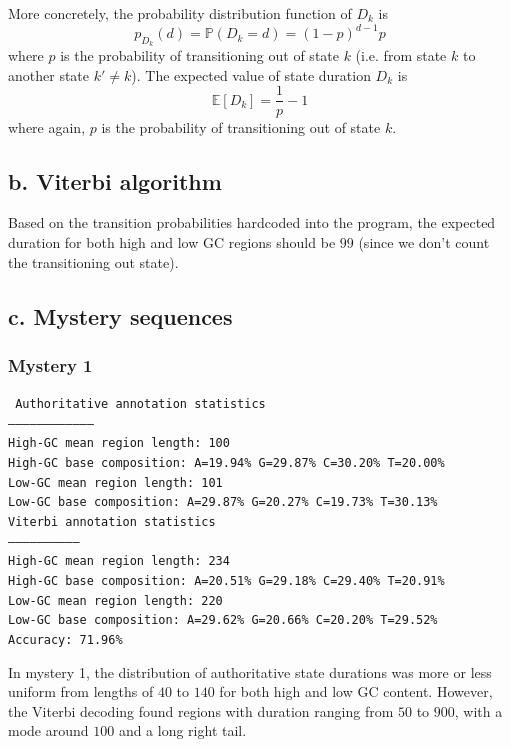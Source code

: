 \documentclass[a4paper]{article}
\begin{document}
More concretely, the probability distribution function of $D_k$ is
\[
p_{D_k}(d) = \mathbb{P}(D_k = d) = (1 - p)^{d - 1}p
\]
where $p$ is the probability of transitioning out of state $k$ (i.e. from state $k$
to another state $k' \neq k$). The expected value of state duration
$D_k$ is
\[
    \mathbb{E}[D_k] = \frac{1}{p} - 1
\]
where again, $p$ is the probability of transitioning out of state $k$.

\subsection*{b. Viterbi algorithm}
Based on the transition probabilities hardcoded into the program, 
the expected duration for both high and low GC regions 
should be $99$ (since we don't count the transitioning out state).

\subsection*{c. Mystery sequences}
\subsubsection*{Mystery 1}
{\tt
Authoritative annotation statistics\\
-----------------------------------\\
High-GC mean region length:  100\\
High-GC base composition: A=19.94\% G=29.87\% C=30.20\% T=20.00\%\\
Low-GC mean region length:  101\\
Low-GC base composition: A=29.87\% G=20.27\% C=19.73\% T=30.13\%\\

\noindent Viterbi annotation statistics\\
-----------------------------\\
High-GC mean region length:  234\\
High-GC base composition: A=20.51\% G=29.18\% C=29.40\% T=20.91\%\\
Low-GC mean region length:  220\\
Low-GC base composition: A=29.62\% G=20.66\% C=20.20\% T=29.52\%\\

\noindent Accuracy: 71.96\%\\
}

In mystery 1, the distribution of authoritative state
durations was more or less uniform from lengths of $40$
to $140$ for both high and low GC content. However, the Viterbi
decoding found regions with duration ranging from $50$ to $900$,
with a mode around $100$ and a long right tail.
\end{document}
